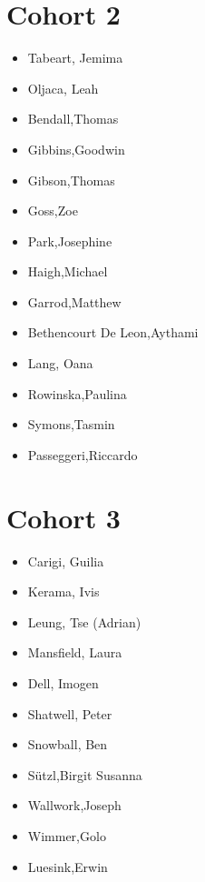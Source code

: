 \documentclass{article}
\begin{document}
\section*{Cohort 2}
\begin{itemize}
    \item Tabeart, Jemima \cite{tabeart2018conditioning, tabeart2020improving, tabeart2020impact}
    \item Oljaca, Leah \cite{oljaca2018almost}
    \item Bendall,Thomas \cite{bendall2020compatible, bendall2019recovered, bendall2019statistical}
    \item Gibbins,Goodwin \cite{gibbins2020entropy}
    \item Gibson,Thomas \cite{shipton2018higher, bendall2020compatible, gibson2020slate, gibson2019compatible, Gibson2019a, Gibson2019b, Gibson2019c, Gibson2019d}
    \item Goss,Zoe \cite{goss2020identifying,coles2021tidal}
    \item Park,Josephine
    \item Haigh,Michael \cite{haigh2018potential, haigh2020rossby}
    \item Garrod,Matthew \cite{garrod2018large}
    \item Bethencourt De Leon,Aythami \cite{de2020implications,alonso2020modelling,alonso2019burgers,alonso2020well}
    \item Lang, Oana
    \item Rowinska,Paulina \cite{everitt2020delayed}
    \item Symons,Tasmin \cite{bingham2016brownian}
    \item Passeggeri,Riccardo \cite{passeggeri2020spectral, passeggeri2019mixing, passeggeri2019limit, passeggeri2020signature}
\end{itemize}

\section*{Cohort 3}
\begin{itemize}
    \item Carigi, Guilia 
    \item Kerama, Ivis
    \item Leung, Tse (Adrian) \cite{leung2020impact, leung2019atmospheric}
    \item Mansfield, Laura \cite{mansfield2020predicting}
    \item Dell, Imogen
    \item Shatwell, Peter \cite{shatwell2020ocean}
    \item Snowball, Ben \cite{snowball2020sparse}
    \item Sützl,Birgit Susanna \cite{sutzl2020drag}
    \item Wallwork,Joseph \cite{wallwork2020goal}
    \item Wimmer,Golo \cite{wimmer2020energy}
    \item Luesink,Erwin \cite{geurts2019lyapunov, de2020implications}
\end{itemize}
\end{document}
